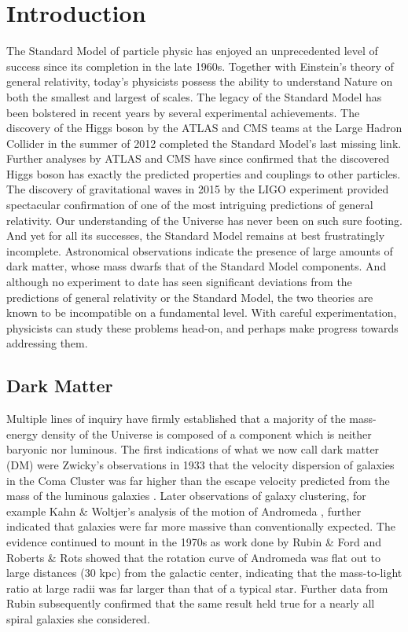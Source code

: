 \chapter{Introduction}
The Standard Model of particle physic has enjoyed an unprecedented level of success since its completion in the late 1960s. Together with Einstein's theory of general relativity, today's physicists possess the ability to understand Nature on both the smallest and largest of scales.
The legacy of the Standard Model has been bolstered in recent years by several experimental achievements. The discovery of the Higgs boson by the ATLAS \cite{the_atlas_collaboration_observation_2012} and CMS \cite{the_cms_collaboration_observation_2012} teams at the Large Hadron Collider in the summer of 2012 completed the Standard Model's last missing link. Further analyses by ATLAS and CMS have since confirmed that the discovered Higgs boson has exactly the predicted properties and couplings to other particles. The discovery of gravitational waves in 2015 by the LIGO experiment \cite{ligo_scientific_collaboration_and_virgo_collaboration_observation_2016} provided spectacular confirmation of one of the most intriguing predictions of general relativity. Our understanding of the Universe has never been on such sure footing.
And yet for all its successes, the Standard Model remains at best frustratingly incomplete. Astronomical observations indicate the presence of large amounts of dark matter, whose mass dwarfs that of the Standard Model components. And although no experiment to date has seen significant deviations from the predictions of general relativity or the Standard Model, the two theories are known to be incompatible on a fundamental level. With careful experimentation, physicists can study these problems head-on, and perhaps make progress towards addressing them. 

\section{Dark Matter}
Multiple lines of inquiry have firmly established that a majority of the mass-energy density of the Universe is composed of a component which is neither baryonic nor luminous. The first indications of what we now call dark matter (DM) were Zwicky's observations in 1933 that the velocity dispersion of galaxies in the Coma Cluster was far higher than the escape velocity predicted from the mass of the luminous galaxies \cite{zwicky_1933}. Later observations of galaxy clustering, for example Kahn \& Woltjer's analysis of the motion of Andromeda \cite{kahn_intergalactic_1959}, further indicated that galaxies were far more massive than conventionally expected. The evidence continued to mount in the 1970s as work done by Rubin \& Ford \cite{rubin_rotation_1970} and Roberts \& Rots \cite{roberts_comparison_1973} showed that the rotation curve of Andromeda was flat out to large distances (30 kpc) from the galactic center, indicating that the mass-to-light ratio at large radii was far larger than that of a typical star. Further data from Rubin \cite{rubin_extended_1978} subsequently confirmed that the same result held true for a nearly all spiral galaxies she considered. 
 
